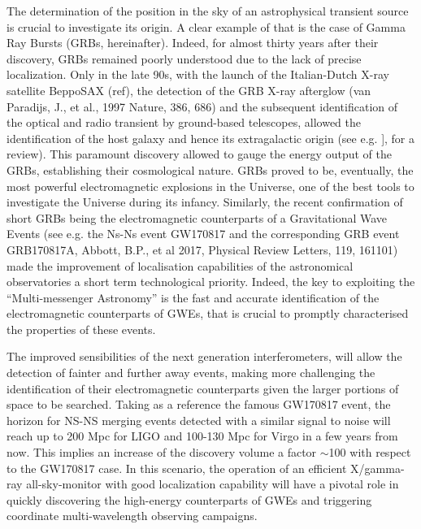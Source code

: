 \documentclass[]{spie}  %
\begin{document}
The determination of the position in the sky of an astrophysical transient source is crucial to investigate its origin. A clear example of that is the case of Gamma Ray Bursts (GRBs, hereinafter). Indeed, for almost thirty years after their discovery, GRBs remained poorly understood due to the lack of precise localization. Only in the late 90s, with the launch of the Italian-Dutch X-ray satellite BeppoSAX (ref), the detection of the GRB X-ray afterglow (van Paradijs, J., et al., 1997 Nature, 386, 686) and the subsequent identification of the optical and radio transient by ground-based telescopes, allowed the identification of the host galaxy and hence its extragalactic origin (see e.g. ], for a review). This paramount discovery allowed to gauge the energy output of the GRBs, establishing their cosmological nature. GRBs proved to be, eventually, the most powerful electromagnetic explosions in the Universe, one of the best tools to investigate the Universe during its infancy. Similarly, the recent confirmation of short GRBs being the electromagnetic counterparts of a Gravitational Wave Events (see e.g. the Ns-Ns event GW170817 and the corresponding GRB event GRB170817A, Abbott, B.P., et al 2017, Physical Review Letters, 119, 161101) made the improvement of localisation capabilities of the astronomical observatories a short term technological priority. Indeed, the key to exploiting the “Multi-messenger Astronomy” is the fast and accurate identification of the electromagnetic counterparts of GWEs, that is crucial to promptly characterised the properties of these events. 

The improved sensibilities of the next generation interferometers, will allow the detection of fainter and further away events, making more challenging the identification of their electromagnetic counterparts given the larger portions of space to be searched. Taking as a reference the famous GW170817 event, the horizon for NS-NS merging events detected with a similar signal to noise will reach up to 200 Mpc for LIGO and 100-130 Mpc for Virgo in a few years from now. This implies an increase of the discovery volume a factor $\sim$100 with respect to the GW170817 case. In this scenario, the operation of an efficient X/gamma-ray all-sky-monitor with good localization capability will have a pivotal role in quickly discovering the high-energy counterparts of GWEs and triggering coordinate multi-wavelength observing campaigns.
\end{document}
